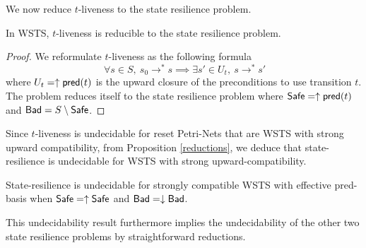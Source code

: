 We now reduce $t$-liveness to the state resilience problem.

\begin{proposition}\label{reductions}
In WSTS, $t$-liveness is reducible to the state resilience problem.
\end{proposition}


\begin{proof}
We reformulate $t$-liveness as the following formula
$$ ~ \forall s \in S, ~ s_0 \rightarrow^* s \implies \exists s' \in U_t, ~ s \rightarrow^{*} s'$$  
where
$U_t=\uparrow \textsf{pred}(t)$
is the upward closure of the preconditions to use transition $t$.  
The problem reduces itself to the state resilience problem
where $\textsf{Safe} = \uparrow \textsf{pred}(t)$ and $\textsf{Bad} = S \setminus \textsf{Safe}$.

\end{proof}



\iffalse

\begin{theorem}
The downward reachability problem is reducible to the state resilience problem.
\end{theorem}

\begin{proof}
Let $s \in S$, and a downward-closed set $D$. \alain{je ne comprends pas cette "preuve"}
Take $\Safe = \emptyset$ and $\Bad = D$.
The state resilience problem on $\Safe,\Bad$ asks
whether $\Bad \cap \post^*(s) \rightarrow^* \Safe$  that is equivalent to $\Bad \cap \post^*(s) \subseteq \emptyset$.
If the answer is negative then $s \to^* \Bad$,
else $s \not\to^* \Bad$.
\end{proof}

\fi


Since $t$-liveness is undecidable for reset Petri-Nets that are WSTS with strong upward compatibility, from Proposition \ref{reductions},  we deduce that state-resilience is undecidable for WSTS with strong upward-compatibility.

\begin{theorem}\label{srp up down}
{\sc State-resilience} is undecidable for strongly compatible WSTS with effective pred-basis
when
$\textsf{Safe}=\uparrow \textsf{Safe}$
and $\textsf{Bad}=\downarrow \textsf{Bad}$.
\end{theorem}


This undecidability result furthermore implies the undecidability of the other two state resilience problems by straightforward reductions.


